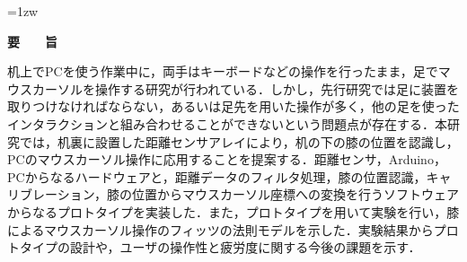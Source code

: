\documentclass[a4paper,11pt]{jreport}
\author{市川　佑}
\begin{document}
\maketitle
\thispagestyle{empty}
\newpage

\thispagestyle{empty}
\vspace*{20pt plus 1fil}
\parindent=1zw
\noindent
\begin{center}
{\Large \bf 要　　旨}
\vspace{2cm}
\end{center}
机上でPCを使う作業中に，両手はキーボードなどの操作を行ったまま，足でマウスカーソルを操作する研究が行われている．しかし，先行研究では足に装置を取りつけなければならない，あるいは足先を用いた操作が多く，他の足を使ったインタラクションと組み合わせることができないという問題点が存在する．本研究では，机裏に設置した距離センサアレイにより，机の下の膝の位置を認識し，PCのマウスカーソル操作に応用することを提案する．距離センサ，Arduino，PCからなるハードウェアと，距離データのフィルタ処理，膝の位置認識，キャリブレーション，膝の位置からマウスカーソル座標への変換を行うソフトウェアからなるプロトタイプを実装した．また，プロトタイプを用いて実験を行い，膝によるマウスカーソル操作のフィッツの法則モデルを示した．実験結果からプロトタイプの設計や，ユーザの操作性と疲労度に関する今後の課題を示す．

\par
\vspace{0pt plus 1fil}
\newpage

\tableofcontents
\listoffigures
\listoftables

\pagebreak \setcounter{page}{1}















\end{document}
